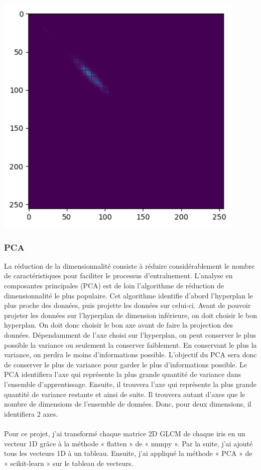 \documentclass[12pt,twoside,letterpaper]{article}
\begin{document}
\begin{center}
    \includegraphics[width = 12cm]{glcm}
\end{center}

\subsubsection{PCA}
La réduction de la dimensionnalité consiste à réduire considérablement le nombre de caractéristiques pour faciliter le processus d’entraînement. L'analyse en composantes principales (PCA) est de loin l'algorithme de réduction de dimensionnalité le plus populaire. Cet algorithme identifie d'abord l'hyperplan le plus proche des données, puis projette les données sur celui-ci. Avant de pouvoir projeter les données sur l’hyperplan de dimension inférieure, on doit choisir le bon hyperplan. On doit donc choisir le bon axe avant de faire la projection des données. Dépendamment de l’axe choisi sur l’hyperplan, on peut conserver le plus possible la variance ou seulement la conserver faiblement. En conservant le plus la variance, on perdra le moins d’informations possible. L’objectif du PCA sera donc de conserver le plus de variance pour garder le plus d’informations possible. Le PCA identifiera l’axe qui représente la plus grande quantité de variance dans l'ensemble d'apprentissage. Ensuite, il trouvera l’axe qui représente la plus grande quantité de variance restante et ainsi de suite. Il trouvera autant d’axes que le nombre de dimensions de l’ensemble de données. Donc, pour deux dimensions, il identifiera 2 axes.
\cite{ref_03}
\\~\\
Pour ce projet, j'ai transformé chaque matrice 2D GLCM de chaque iris en un vecteur 1D grâce à la méthode « flatten » de « numpy ». Par la suite, j'ai ajouté tous les vecteurs 1D à un tableau.  Ensuite, j'ai appliqué la méthode « PCA » de « scikit-learn » sur le tableau de vecteurs.
\end{document}
